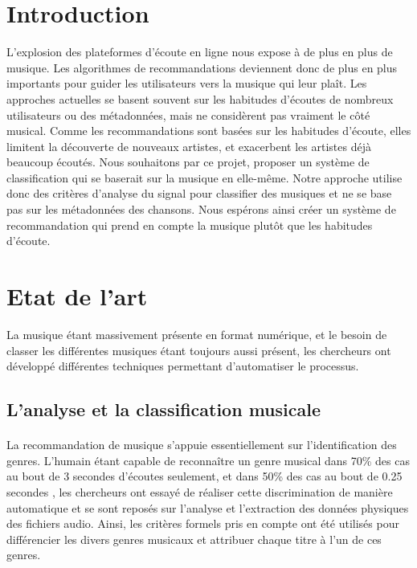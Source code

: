 \documentclass[soumission]{ir}
\begin{document}
\section{Introduction}
L'explosion des plateformes d'écoute en ligne nous expose à de plus en plus de musique. Les algorithmes de
recommandations deviennent donc de plus en plus importants pour guider les utilisateurs vers la musique qui leur 
plaît. Les approches actuelles se basent souvent sur les habitudes d'écoutes de nombreux utilisateurs ou des 
métadonnées, mais ne considèrent pas vraiment le côté musical. Comme les recommandations sont basées sur les 
habitudes d'écoute, elles limitent la découverte de nouveaux artistes, et exacerbent les artistes déjà beaucoup 
écoutés. Nous souhaitons par ce projet, proposer un système de classification qui se baserait sur la musique en
elle-même. Notre approche utilise donc des critères d'analyse du signal pour classifier des musiques et ne se 
base pas sur les métadonnées des chansons. Nous espérons ainsi créer un système de recommandation qui prend en 
compte la musique plutôt que les habitudes d'écoute.

\section{Etat de l'art}
La musique étant massivement présente en format numérique, et le besoin de classer les différentes musiques 
étant toujours aussi présent, les chercheurs ont développé différentes techniques permettant d’automatiser 
le processus.

\subsection{L’analyse et la classification musicale}
\paragraph{}
La recommandation de musique s’appuie essentiellement sur l’identification des genres. L’humain étant capable 
de reconnaître un genre musical dans 70\% des cas au bout de 3 secondes d’écoutes seulement, et dans 50\% 
des cas au bout de 0.25 secondes \cite{TechniqueSimilarites}, les chercheurs ont essayé de réaliser cette 
discrimination de manière automatique et se sont reposés sur l’analyse et l’extraction des données physiques 
des fichiers audio. Ainsi, les critères formels pris en compte ont été utilisés pour différencier les divers 
genres musicaux et attribuer chaque titre à l’un de ces genres.
\end{document}
